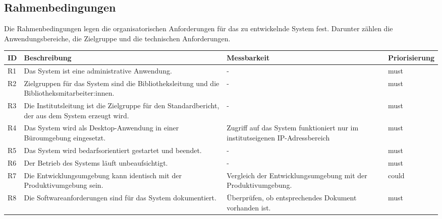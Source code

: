 \subsection{Rahmenbedingungen}
Die Rahmenbedingungen legen die organisatorischen Anforderungen für das zu entwickelnde System fest. 
Darunter zählen die Anwendungsbereiche, die Zielgruppe und die technischen Anforderungen. 
\begingroup
\setlength{\tabcolsep}{10pt} %
\renewcommand{\arraystretch}{1.25} 
\begin{table}[h]
    \centering
    \begin{adjustbox}{max width=\textwidth}
    \begin{tabular}{lp{7.5cm}p{7.5cm}l}
       \toprule
       \textbf{ID}          & \textbf{Beschreibung} & \textbf{Messbarkeit} & \textbf{Priorisierung}\\
       \midrule
        R1                                &Das System ist eine administrative Anwendung. & -  & must\\
        R2                                &Zielgruppen für das System sind die Bibliotheksleitung und die Bibliotheksmitarbeiter:innen. & -  & must\\
        R3                                &Die Institutsleitung ist die Zielgruppe für den Standardbericht, der aus dem System erzeugt wird. & -  & must\\
        R4                                &Das System wird als Desktop-Anwendung in einer Büroumgebung eingesetzt. & Zugriff auf das System funktioniert nur im institutseigenen IP-Adressbereich & must\\
        R5                                &Das System wird bedarfsorientiert gestartet und beendet. & -  & must\\
        R6                                &Der Betrieb des Systems läuft unbeaufsichtigt. & -  & must\\
        R7                                &Die Entwicklungsumgebung kann identisch mit der Produktivumgebung sein. & Vergleich der Entwicklungsumgebung mit der Produktivumgebung.  & could\\
        R8                                &Die Softwareanforderungen sind für das System dokumentiert. & Überprüfen, ob entsprechendes Dokument vorhanden ist.  & must\\

\end{tabular}
\end{adjustbox}
\end{table}
